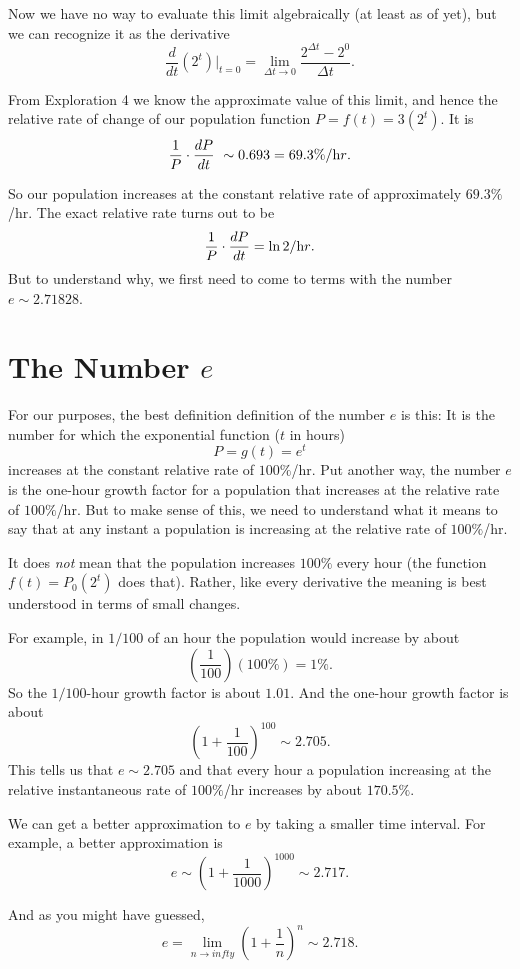 \documentclass{ximera}
\begin{document}
Now we have no way to evaluate this limit algebraically (at least as of yet), but we can recognize it as the derivative
\[
     \frac{d}{dt}\left ( 2^ t \right) \Big|_{t=0} = \lim_{\Delta t\to  0}  \frac{2^{\Delta t} - 2^0}{\Delta t} .
\]

From Exploration 4 we know the approximate value of this limit, and hence the relative rate of change of our population function $P = f(t) = 3(2^t)$. It is
\[
        \frac{1}{P}\cdot \frac{dP}{dt} ~\sim 0.693 = 69.3\% / {\text hr}.
\]

So our population increases at the constant relative rate of approximately $69.3\%$/hr. The exact relative rate turns out to be
\[
  \frac{1}{P}\cdot \frac{dP}{dt} = \ln 2 / {\text hr}.
\]
But to understand why, we first need to come to terms with the number $e\sim 2.71828$.


\section{The Number $e$}

For our purposes, the best definition definition of the number $e$ is this: It is the number for which the exponential function ($t$ in hours)
\[
     P = g(t) = e^t 
\]
increases at the constant relative rate of $100\%$/hr. Put another way, the number $e$ is the one-hour growth factor for a population that increases at the relative rate of $100\%$/hr. But to make sense of this, we need to understand what it means to say that at any instant a population is increasing at the relative rate of $100\%$/hr.

It does \emph{not} mean that the population increases $100\%$ every hour (the function $f(t)=P_0(2^t)$ does that). Rather, like every derivative the meaning is best understood in terms of small changes.

For example, in $1/100$ of an hour the population would increase by about
\[
     \left( \frac{1}{100} \right) (100\%) = 1\%.
\]
So the $1/100$-hour growth factor is about $1.01$. And the one-hour growth factor is about 
\[
  \left( 1 + \frac{1}{100} \right)^{100} \sim 2.705 .
\]
This tells us that $e\sim 2.705$ and that every hour a population increasing at the relative instantaneous rate of $100\%$/hr increases by about $170.5\%$.

We can get a better approximation to $e$ by taking a smaller time interval. For example, a better approximation is 
\[
  e \sim \left( 1 + \frac{1}{1000} \right)^{1000} \sim 2.717 .
\]

And as you might have guessed,
\[
     e = \lim_{n\to infty}\left( 1  + \frac{1}{n} \right)^n \sim 2.718 .
\]
\end{document}
